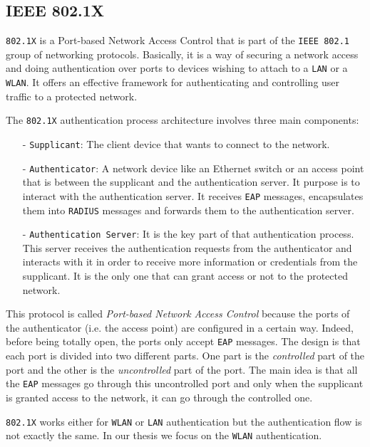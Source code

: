 \subsection{IEEE 802.1X}
\texttt{802.1X} is a Port-based Network Access Control that is part of the \texttt{IEEE 802.1} group of networking protocols. Basically, it is a way of securing a network access and doing authentication over ports to devices wishing to attach to a \texttt{LAN} or a \texttt{WLAN}. It offers an effective framework for authenticating and controlling user traffic to a protected network.

The \texttt{802.1X} authentication process architecture involves three main components:
\begin{itemize}
	\item[-]\texttt{Supplicant}: The client device that wants to connect to the network.
	\item[-]\texttt{Authenticator}: A network device like an Ethernet switch or an access point that is between the supplicant and the authentication server. It purpose is to interact with the authentication server. It receives \texttt{EAP} messages, encapsulates them into \texttt{RADIUS} messages and forwards them to the authentication server.
	\item[-]\texttt{Authentication Server}: It is the key part of that authentication process. This server receives the authentication requests from the authenticator and interacts with it in order to receive more information or credentials from the supplicant. It is the only one that can grant access or not to the protected network.
\end{itemize} 

This protocol is called \textit{Port-based Network Access Control} because the ports of the authenticator (i.e. the access point) are configured in a certain way. Indeed, before being totally open, the ports only accept \texttt{EAP} messages. The design is that each port is divided into two different parts. One part is the \textit{controlled} part of the port and the other is the \textit{uncontrolled} part of the port. The main idea is that all the \texttt{EAP} messages go through this uncontrolled port and only when the supplicant is granted access to the network, it can go through the controlled one.

\texttt{802.1X} works either for \texttt{WLAN} or \texttt{LAN} authentication but the authentication flow is not exactly the same. In our thesis we focus on the \texttt{WLAN} authentication.

